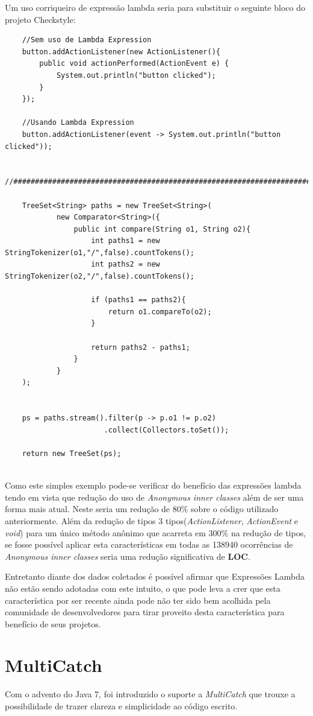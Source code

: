 Um uso corriqueiro de expressão lambda seria para substituir o seguinte bloco do projeto Checkstyle:
\begin{lstlisting}
	//Sem uso de Lambda Expression
	button.addActionListener(new ActionListener(){
		public void actionPerformed(ActionEvent e) {
			System.out.println("button clicked");
		}
	});

	//Usando Lambda Expression
	button.addActionListener(event -> System.out.println("button clicked"));
	
	//###########################################################################
	
	TreeSet<String> paths = new TreeSet<String>(
			new Comparator<String>({
				public int compare(String o1, String o2){
					int paths1 = new StringTokenizer(o1,"/",false).countTokens();
					int paths2 = new StringTokenizer(o2,"/",false).countTokens();
				
					if (paths1 == paths2){
						return o1.compareTo(o2);
					}
				
					return paths2 - paths1;
				}
			}
	);
	
	
	ps = paths.stream().filter(p -> p.o1 != p.o2)
					   .collect(Collectors.toSet());
	
	return new TreeSet(ps);
	
\end{lstlisting}

Como este simples exemplo pode-se verificar do benefício das expressões lambda tendo em vista que  redução do uso de \textit{Anonymous inner classes} além de ser uma forma mais atual. Neste seria um redução de 80\% sobre o código utilizado anteriormente. Além da redução de tipos 3 tipos(\textit{ActionListener}, \textit{ActionEvent} e \textit{void}) para um único método anônimo que acarreta em 300\% na redução de tipos,  se fosse possível aplicar esta características em todas as 138940 ocorrências de \textit{Anonymous inner classes} seria uma redução significativa de \textbf{LOC}.

Entretanto diante dos dados coletados é possível afirmar que Expressões Lambda não estão sendo adotadas com este intuito, o que pode leva a crer que esta característica por ser recente ainda pode não ter sido bem acolhida pela comunidade de desenvolvedores para tirar proveito desta  característica para benefício de seus projetos.\\

\section{MultiCatch}
Com o advento do Java 7, foi introduzido o suporte a \textit{MultiCatch} que trouxe a possibilidade de trazer clareza e simplicidade ao código escrito.\\

